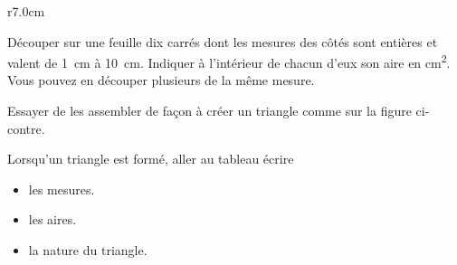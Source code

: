 

\begin{wrapfigure}{r}{7.0cm}
   \vspace{-0.5cm}        %
   \centering
   
\end{wrapfigure}


Découper sur une feuille dix carrés dont les mesures des côtés sont entières et valent de \SI{1}{\centi\meter} à \SI{10}{\centi\meter}. Indiquer à l'intérieur de chacun d'eux son aire en \si{\centi\meter\squared}. Vous pouvez en découper plusieurs de la même mesure.

Essayer de les assembler de façon à créer un triangle comme sur la figure ci-contre.

Lorsqu'un triangle est formé, aller au tableau écrire
\begin{itemize}
    \item les mesures.
    \item les aires.
    \item la nature du triangle.
\end{itemize}
